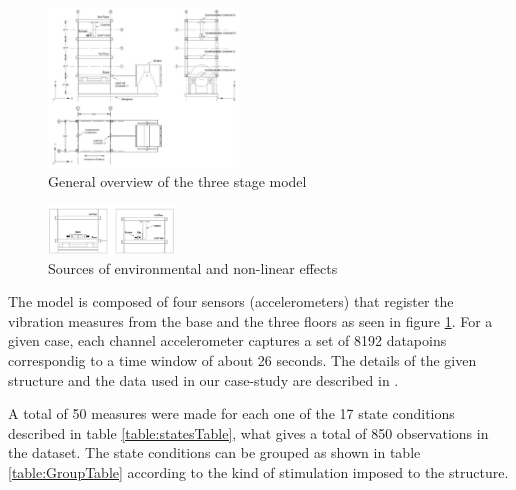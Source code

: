 \documentclass[twocolumn]{article}
\begin{document}
\begin{figure}[H]
      \centering
      \includegraphics[width=0.45\textwidth]{experiment_01.PNG}
      \caption{General overview of the three stage model}
      \label{fig:experiment01}
\end{figure}

\begin{figure}[H]
      \centering
      \includegraphics[width=0.3\textwidth]{experiment_02.PNG}
      \caption{Sources of environmental and non-linear effects}
      \label{fig:experiment02}
\end{figure}

The model is composed of four sensors (accelerometers) that register the vibration measures from the base and the three floors as seen in figure \ref{fig:experiment01}. For a given case, each channel accelerometer captures a set of 8192 datapoins correspondig to a time window of about 26 seconds. The details of the given structure and the data used in our case-study are described in \cite{report_dataset}.

A total of 50 measures were made for each one of the 17 state conditions described in table \ref{table:statesTable}, what gives a total of 850 observations in the dataset. The state conditions can be grouped as shown in table \ref{table:GroupTable} according to the kind of stimulation imposed to the structure.
\end{document}

